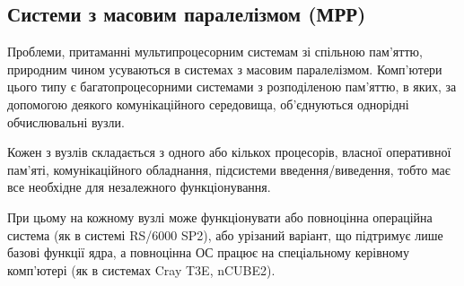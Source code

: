 % 
% 
% 
% 
% 

\subsection{Системи з масовим паралелізмом (МРР)}


Проблеми, притаманні мультипроцесорним системам зі спільною пам'яттю, природним чином усуваються в системах з масовим паралелізмом. Комп'ютери цього типу є багатопроцесорними системами з розподіленою пам'яттю, в яких, за допомогою деякого комунікаційного середовища, об'єднуються однорідні обчислювальні вузли.
  
Кожен з вузлів складається з одного або кількох процесорів, власної оперативної пам'яті, комунікаційного обладнання, підсистеми введення/виведення, тобто має все необхідне для незалежного функціонування. 

При цьому на кожному вузлі може функціонувати або повноцінна операційна система (як в системі RS/6000 SP2), або урізаний варіант, що підтримує лише базові функції ядра, а повноцінна ОС працює на спеціальному керівному комп'ютері (як в системах Cray T3E, nCUBE2). 

